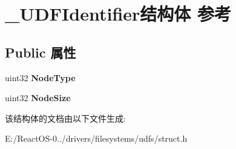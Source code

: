\hypertarget{struct___u_d_f_identifier}{}\section{\+\_\+\+U\+D\+F\+Identifier结构体 参考}
\label{struct___u_d_f_identifier}
\subsection*{Public 属性}
\begin{DoxyCompactItemize}
\item 
\mbox{\label{struct___u_d_f_identifier_a24b730afab1bfe2f3d2139f9afcce6a0}} 
uint32 {\bfseries Node\+Type}
\item 
\mbox{\label{struct___u_d_f_identifier_a38fcd5c896b9801bc39b48e5b6efdb3b}} 
uint32 {\bfseries Node\+Size}
\end{DoxyCompactItemize}


该结构体的文档由以下文件生成\+:\begin{DoxyCompactItemize}
\item 
E\+:/\+React\+O\+S-\/0../drivers/filesystems/udfs/struct.\+h\end{DoxyCompactItemize}
